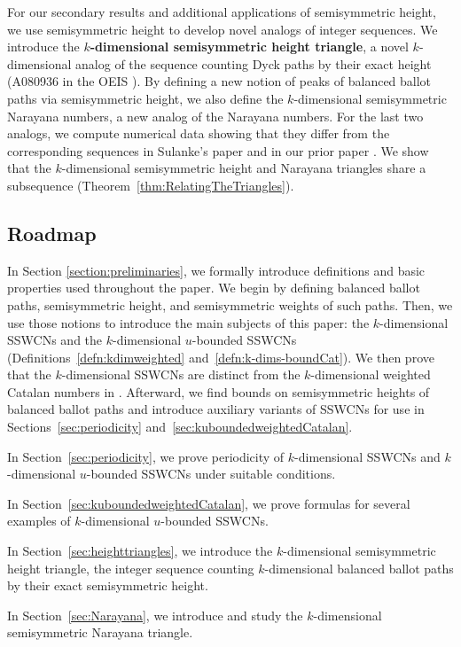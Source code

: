 \documentclass[11pt]{article}
\theoremstyle{remark}
\theoremstyle{definition}
\begin{document}
For our secondary results and additional applications of semisymmetric height, we use semisymmetric height to develop novel analogs of integer sequences. We introduce the \textbf{$k$-dimensional semisymmetric height triangle}, a novel $k$-dimensional analog of the sequence counting Dyck paths by their exact height (A080936 in the OEIS \cite{oeis}). By defining a new notion of peaks of balanced ballot paths via semisymmetric height, we also define the $k$-dimensional semisymmetric Narayana numbers, a new analog of the Narayana numbers. For the last two analogs, we compute numerical data showing that they differ from the corresponding sequences in Sulanke's paper \cite{multidimnarayana} and in our prior paper \cite{MR5034574}. We show that the $k$-dimensional semisymmetric height and Narayana triangles share a subsequence (Theorem~\ref{thm:RelatingTheTriangles}).

\subsection{Roadmap}

 In Section \ref{section:preliminaries}, we formally introduce definitions and basic properties used throughout the paper. We begin by defining balanced ballot paths, semisymmetric height, and semisymmetric weights of such paths. Then, we use those notions to introduce the main subjects of this paper: the $k$-dimensional SSWCNs and the $k$-dimensional $u$-bounded SSWCNs (Definitions~\ref{defn:kdimweighted} and~\ref{defn:k-dims-boundCat}). We then prove that the $k$-dimensional SSWCNs are distinct from the $k$-dimensional weighted Catalan numbers in \cite{MR5034574}. Afterward, we find bounds on semisymmetric heights of balanced ballot paths and introduce auxiliary variants of SSWCNs for use in Sections~\ref{sec:periodicity} and~\ref{sec:kuboundedweightedCatalan}.

In Section~\ref{sec:periodicity}, we prove periodicity of $k$-dimensional SSWCNs and $k$-dimensional $u$-bounded SSWCNs under suitable conditions.

In Section~\ref{sec:kuboundedweightedCatalan}, we prove formulas for several examples of $k$-dimensional $u$-bounded SSWCNs.

In Section~\ref{sec:heighttriangles}, we introduce the $k$-dimensional semisymmetric height triangle,  the integer sequence counting $k$-dimensional balanced ballot paths by their exact semisymmetric height. 

In Section~\ref{sec:Narayana}, we introduce and study the $k$-dimensional semisymmetric Narayana triangle. 
\end{document}
